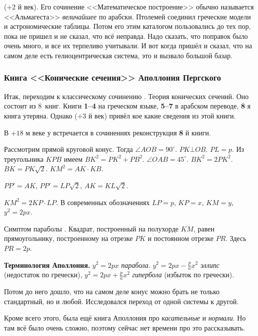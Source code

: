 \documentclass[a4paper,oneside,fleqn,10pt]{article}
\newcommand{\cpic}[1]{$$\epsfbox{pictures.#1}$$}
\begin{document}
 ($+2$ й век).
Его сочинение <<Математическое построение>> обычно называется <<Альмагеста>>
\emph{величайшее} по арабски. Птолемей соединил греческие модели и астрономические
таблицы. Потом его этим каталогом пользовались до тех пор, пока 
не пришел и не сказал, что всё неправда.
Надо сказать, что поправок было очень много, и все их терпеливо учитывали.
И вот когда  пришёл и сказал, что на самом деле есть гелиоцентрическая система,
это и вызвало большой базар.

\subsubsection{Книга <<Конические сечения>> Аполлония Пергского}

Итак, переходим к классическому сочинению . Теория конических сечений.
Оно состоит из 8~книг. Книги \textbf{1--4} на греческом языке, \textbf{5--7}
в арабском  переводе, \textbf{8} я книга утеряна.
Однако  ($+3$ й век) привёл кое какие сведения из этой книги.

В $+18$ м веке у  встречается в сочинениях реконструкция \textbf{8} й книги.

Рассмотрим прямой круговой конус. Тогда
$\angle AOB = 90^\circ$. $PK \bot OB$. $PL = p$.
Из треугольника $KPB$ имеем $BK^2 = PK^2 + PB^2$.
$\angle OAB = 45^\circ$. $BK^2 = 2PK^2$. $BK = PK\sqrt2$.
$KM^2 = AK\cdot KB$.


$PP' = AK$, $PP' = LP\sqrt2$, $AK = KL\sqrt2$.

$KM^2 = 2KP\cdot LP$. В современных обозначениях $LP = p$,
$KP = x$, $KM = y$,
$y^2 = 2px$.

Симптом параболы .
Квадрат, построенный на полухорде $KM$, равен прямоугольнику,
построенному на отрезке $PK$ и постоянном отрезке $PR$.
Здесь $PR = 2p$.

\textbf{Терминология Аполлония.}
$y^2 = 2px$ \emph{парабола}.
$y^2 = 2px - \frac pa x^2$ \emph{эллипс} (недостаток по гречески),
$y^2 = 2px + \frac pa x^2$ \emph{гипербола} (избыток по гречески).

Потом до него дошло, что на самом деле конус можно брать не только
стандартный, но и любой. Исследовался переход от одной системы к другой.

Кроме всего этого, была ещё книга Аполлония про \emph{касательные} и \emph{нормали}.
Но там всё было очень сложно, поэтому сейчас нет времени про это рассказывать.
\end{document}

